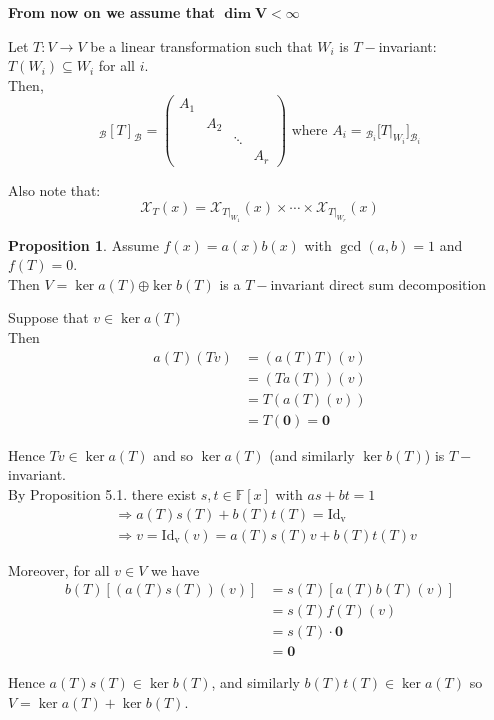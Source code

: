 \documentclass[11pt, a4paper]{report}
\makeatletter
\numberwithin{equation}{section}
\renewcommand{\chi}{\mathcal{X}}
\newcommand{\opl}{\boldsymbol{\oplus}}
\newcommand{\F}{\mathbb{F}}
\newcommand{\pmx}[1]{\begin{pmatrix}#1\end{pmatrix}}
\numberwithin{equation}{subsection}
\theoremstyle{plain}
\theoremstyle{definition}
\newtheorem{prop}[thm]{Proposition}
\theoremstyle{remark}
\newtheorem*{prf}{Proof}
\renewenvironment{prf}[1][\proofname]{\par
  \vspace{-\topsep}%
  \normalfont
  \topsep0pt \partopsep0pt %
  \trivlist
  \item[\hskip\labelsep
        \itshape
    #1\@addpunct{.}]\ignorespaces
}{%
  \popQED\endtrivlist\@endpefalse
  \addvspace{6pt plus 6pt} %
}
\newcommand{\pr}[1]{\begin{adjustwidth}{1cm}{} \begin{prf} #1 \end{prf} \end{adjustwidth}}
\makeatother
\begin{document}
\textbf{From now on we assume that $\boldsymbol{\dim V < \infty}$}

Let $T: V \to V$ be a linear transformation such that $W_i$ is $T-$invariant: $T(W_i) \subseteq W_i$ for all $i$.\\
Then,
\[
_\mathcal{B}[T]_\mathcal{B} = \pmx{A_1 \\ & A_2 \\ & & \ddots \\ & & & A_r }
\text{ where } A_i = {_{\mathcal{B}_i}[}T|_{W_i}]_{\mathcal{B}_i}
\]

Also note that:
$$ \chi_T (x) = \chi_{T|_{W_1}}(x) \times \cdots \times \chi_{T|_{W_r}}(x) $$

\begin{prop} Assume $f(x) = a(x)b(x)$ with $\gcd(a,b) = 1$ and $f(T) = 0$.\\ Then $V = \ker a(T) \opl \ker b(T)$ is a $T-$invariant direct sum decomposition 

\pr{
Suppose that $v \in \ker a(T)$\\
Then
\begin{align*}
a(T)(Tv) 	&= (a(T)T)(v)\\ 	
			&= (Ta(T))(v)\\
			&= T(a(T)(v))\\
			&= T(\boldsymbol{0}) = \boldsymbol{0}
\end{align*}

Hence $Tv \in \ker a(T)$ and so $\ker a(T)$ (and similarly $\ker b(T)$) is $T-$invariant.\\
By Proposition 5.1. there exist $s,t \in \F[x]$ with $as + bt = 1$
\begin{align*}
&\Rightarrow a(T)s(T) + b(T)t(T) = \mathrm{Id_v}\\
&\Rightarrow v = \mathrm{Id_v}(v) = a(T)s(T)v + b(T)t(T)v \tag{$*$}
\end{align*}\vspace*{-32pt}

Moreover, for all $v \in V$ we have
\begin{align*}
b(T)[(a(T)s(T))(v)] &= s(T)[a(T)b(T)(v)]\\
					&= s(T)f(T)(v) \tag{$ab = f$}\\
					&= s(T) \cdot \boldsymbol{0} \tag{$f(T) = 0$}\\
					&= \boldsymbol{0}
\end{align*}

Hence $a(T)s(T) \in \ker b(T)$, and similarly $b(T)t(T) \in \ker a(T)$ so $V = \ker a(T) + \ker b(T)$.

}
\end{prop}
\end{document}
